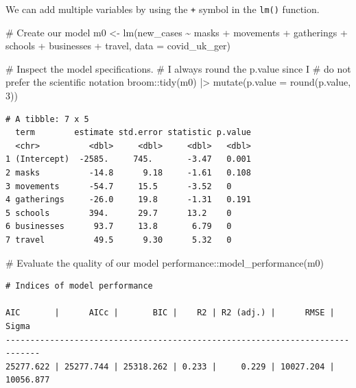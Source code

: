 \documentclass[
  letterpaper,
]{krantz}
\makeatletter
\newenvironment{Shaded}{\begin{snugshade}}{\end{snugshade}}
\newcommand{\AttributeTok}[1]{\textcolor[rgb]{0.40,0.45,0.13}{#1}}
\newcommand{\CommentTok}[1]{\textcolor[rgb]{0.37,0.37,0.37}{#1}}
\newcommand{\DecValTok}[1]{\textcolor[rgb]{0.68,0.00,0.00}{#1}}
\newcommand{\FunctionTok}[1]{\textcolor[rgb]{0.28,0.35,0.67}{#1}}
\newcommand{\NormalTok}[1]{\textcolor[rgb]{0.00,0.23,0.31}{#1}}
\newcommand{\OtherTok}[1]{\textcolor[rgb]{0.00,0.23,0.31}{#1}}
\newcommand{\SpecialCharTok}[1]{\textcolor[rgb]{0.37,0.37,0.37}{#1}}
\newenvironment{kframe}{%
\medskip{}
\setlength{\fboxsep}{.8em}
 \def\at@end@of@kframe{}%
 \ifinner\ifhmode%
  \def\at@end@of@kframe{\end{minipage}}%
  \begin{minipage}{\columnwidth}%
 \fi\fi%
 \def\FrameCommand##1{\hskip\@totalleftmargin \hskip-\fboxsep
 \colorbox{shadecolor}{##1}\hskip-\fboxsep
     \hskip-\linewidth \hskip-\@totalleftmargin \hskip\columnwidth}%
 \MakeFramed {\advance\hsize-\width
   \@totalleftmargin\z@ \linewidth\hsize
   \@setminipage}}%
 {\par\unskip\endMakeFramed%
 \at@end@of@kframe}
\renewenvironment{Shaded}{\begin{kframe}}{\end{kframe}}
\makeatother
\begin{document}
We can add multiple variables by using the \texttt{+} symbol in the
\texttt{lm()} function.

\begin{Shaded}
\begin{Highlighting}[]
\CommentTok{\# Create our model}
\NormalTok{m0 }\OtherTok{\textless{}{-}} \FunctionTok{lm}\NormalTok{(new\_cases }\SpecialCharTok{\textasciitilde{}}\NormalTok{ masks }\SpecialCharTok{+}\NormalTok{ movements }\SpecialCharTok{+}\NormalTok{ gatherings }\SpecialCharTok{+}
\NormalTok{           schools }\SpecialCharTok{+}\NormalTok{ businesses }\SpecialCharTok{+}\NormalTok{ travel,}
         \AttributeTok{data =}\NormalTok{ covid\_uk\_ger)}

\CommentTok{\# Inspect the model specifications.}
\CommentTok{\# I always round the p.value since I}
\CommentTok{\# do not prefer the scientific notation}
\NormalTok{broom}\SpecialCharTok{::}\FunctionTok{tidy}\NormalTok{(m0) }\SpecialCharTok{|\textgreater{}}
  \FunctionTok{mutate}\NormalTok{(}\AttributeTok{p.value =} \FunctionTok{round}\NormalTok{(p.value, }\DecValTok{3}\NormalTok{))}
\end{Highlighting}
\end{Shaded}

\begin{verbatim}
# A tibble: 7 x 5
  term        estimate std.error statistic p.value
  <chr>          <dbl>     <dbl>     <dbl>   <dbl>
1 (Intercept)  -2585.     745.       -3.47   0.001
2 masks          -14.8      9.18     -1.61   0.108
3 movements      -54.7     15.5      -3.52   0    
4 gatherings     -26.0     19.8      -1.31   0.191
5 schools        394.      29.7      13.2    0    
6 businesses      93.7     13.8       6.79   0    
7 travel          49.5      9.30      5.32   0    
\end{verbatim}

\begin{Shaded}
\begin{Highlighting}[]
\CommentTok{\# Evaluate the quality of our model}
\NormalTok{performance}\SpecialCharTok{::}\FunctionTok{model\_performance}\NormalTok{(m0)}
\end{Highlighting}
\end{Shaded}

\begin{verbatim}
# Indices of model performance

AIC       |      AICc |       BIC |    R2 | R2 (adj.) |      RMSE |     Sigma
-----------------------------------------------------------------------------
25277.622 | 25277.744 | 25318.262 | 0.233 |     0.229 | 10027.204 | 10056.877
\end{verbatim}
\end{document}
